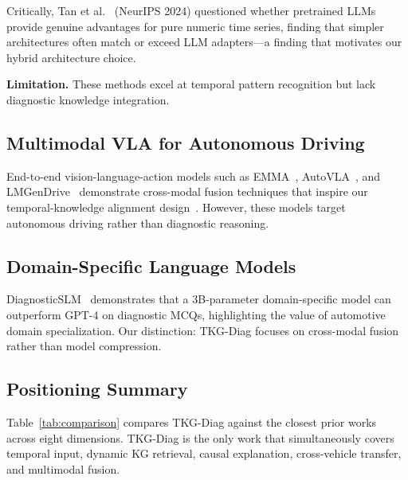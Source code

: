 \documentclass[11pt,a4paper]{article}
\begin{document}
Critically, Tan et al.~\cite{tan2024llmts} (NeurIPS 2024) questioned whether pretrained LLMs provide genuine advantages for pure numeric time series, finding that simpler architectures often match or exceed LLM adapters---a finding that motivates our hybrid architecture choice.

\textbf{Limitation.} These methods excel at temporal pattern recognition but lack diagnostic knowledge integration.

\subsection{Multimodal VLA for Autonomous Driving}\label{sec:rw:vla}

End-to-end vision-language-action models such as EMMA~\cite{hwang2024emma}, AutoVLA~\cite{zhou2025autovla}, and LMGenDrive~\cite{shao2026lmgen} demonstrate cross-modal fusion techniques that inspire our temporal-knowledge alignment design~\cite{hu2025vlasurvey}. However, these models target autonomous driving rather than diagnostic reasoning.

\subsection{Domain-Specific Language Models}\label{sec:rw:slm}

DiagnosticSLM~\cite{vidyaratne2025diagnosticslm} demonstrates that a $3$B-parameter domain-specific model can outperform GPT-4 on diagnostic MCQs, highlighting the value of automotive domain specialization. Our distinction: TKG-Diag focuses on cross-modal fusion rather than model compression.

\subsection{Positioning Summary}\label{sec:rw:positioning}

Table~\ref{tab:comparison} compares TKG-Diag against the closest prior works across eight dimensions. TKG-Diag is the only work that simultaneously covers temporal input, dynamic KG retrieval, causal explanation, cross-vehicle transfer, and multimodal fusion.
\end{document}
